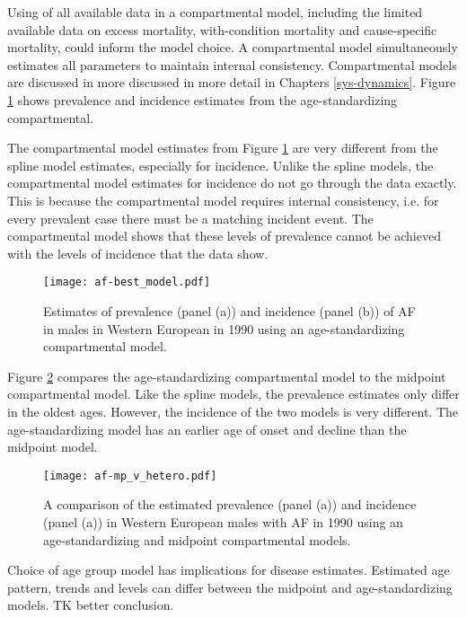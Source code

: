 Using of all available data in a compartmental model, including the
limited available data on excess mortality, with-condition mortality
and cause-specific mortality, could inform the model choice.
A compartmental model simultaneously estimates all parameters to
maintain internal consistency.  Compartmental models are discussed
in more discussed in more detail in Chapters \ref{sys-dynamics}.
Figure \ref{fig:app-af age-stand} shows prevalence and incidence estimates
from the age-standardizing compartmental.

The compartmental model estimates from Figure \ref{fig:app-af age-stand}
are very different from the spline model estimates, especially for incidence.
Unlike the spline models, the compartmental model estimates for
incidence do not go through the data exactly.  This is because the compartmental model
requires internal consistency, i.e. for every prevalent case there must be
a matching incident event.  The compartmental model shows that these levels
of prevalence cannot be achieved with the levels of incidence that the data show.

    \begin{figure}[h]
        \begin{center}
            \texttt{[image: af-best\_model.pdf]}
            \caption{Estimates of prevalence (panel (a)) and incidence (panel (b))
              of AF in males in Western European in 1990 using
              an age-standardizing compartmental model.}
            \label{fig:app-af age-stand}
        \end{center}
    \end{figure}

Figure \ref{fig:app-af compare} compares the age-standardizing compartmental
model to the midpoint compartmental model.  Like the spline models,
the prevalence estimates only differ in the oldest ages.  However, the
incidence of the two models is very different.  The age-standardizing model
has an earlier age of onset and decline than the midpoint model.

    \begin{figure}[h]
        \begin{center}
            \texttt{[image: af-mp\_v\_hetero.pdf]}
            \caption{A comparison of the estimated prevalence (panel (a)) and incidence
              (panel (a)) in Western European males with AF in 1990
              using an age-standardizing and midpoint compartmental models.}
            \label{fig:app-af compare}
        \end{center}
    \end{figure}

Choice of age group model has implications for disease estimates.  Estimated age pattern, trends and levels can differ between the midpoint and age-standardizing models.  TK better conclusion. 